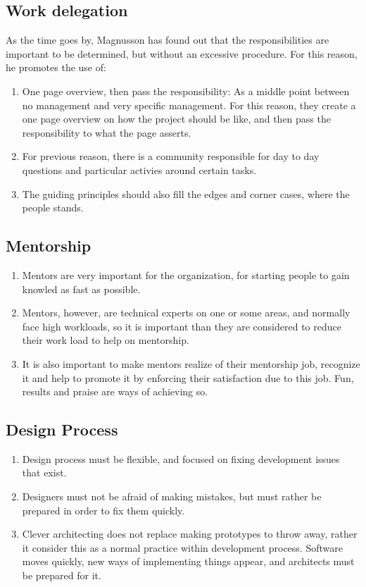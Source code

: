 \documentclass[11pt]{article}
\begin{document}
\subsection{Work delegation}
As the time goes by, Magnusson has found out that the responsibilities are important to be determined, but without an excessive procedure.
For this reason, he promotes the use of:
\begin{enumerate}\itemsep0pt
\item{One page overview, then pass the responsibility: As a middle point between no management and very specific management. For this reason, they create a one page overview on how the project should be like, and then pass the responsibility to what the page asserts.}
\item{For previous reason, there is a community responsible for day to day questions and particular activies around certain tasks.}
\item{The guiding principles should also fill the edges and corner cases, where the people stands.}
\end{enumerate}

\subsection{Mentorship}
\begin{enumerate}\itemsep0pt
\item{Mentors are very important for the organization, for starting people to gain knowled as fast as possible.}
\item{Mentors, however, are technical experts on one or some areas, and normally face high workloads, so it is important than they are considered to reduce their work load to help on mentorship.}
\item{It is also important to make mentors realize of their mentorship job, recognize it and help to promote it by enforcing their satisfaction due to this job. Fun, results and praise are ways of achieving so.}
\end{enumerate}
  
\subsection{Design Process}
\begin{enumerate}\itemsep0pt
\item{Design process must be flexible, and focused on fixing development issues that exist.}
\item{Designers must not be afraid of making mistakes, but must rather be prepared in order to fix them quickly.}
\item{Clever architecting does not replace making prototypes to throw away, rather it consider this as a normal practice within development process. Software moves quickly, new ways of implementing things appear, and architects must be prepared for it.}
\end{enumerate}
\end{document}
